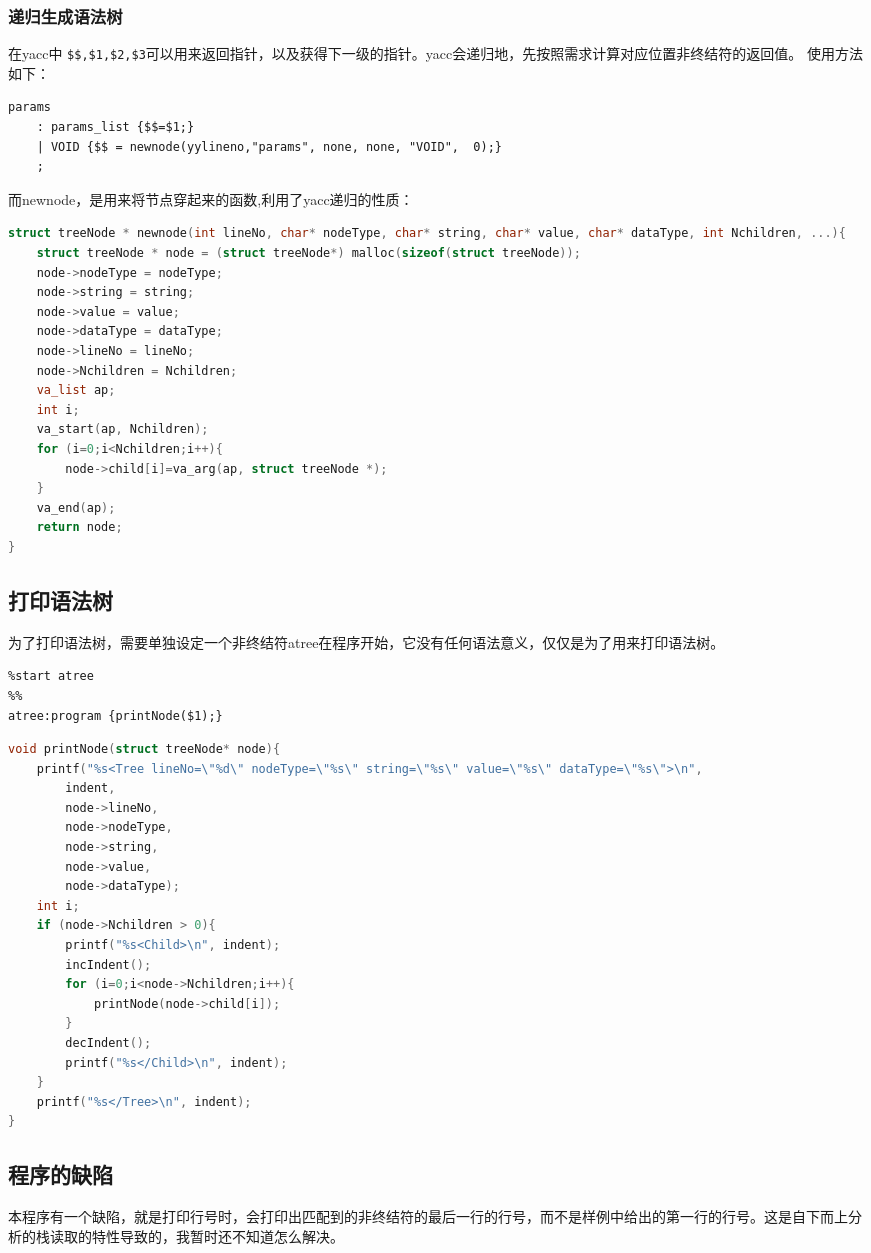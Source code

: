 \documentclass{article}
\begin{document}
\begin{CJK}{UTF8}{gkai}
\subsubsection{递归生成语法树}
在yacc中 \verb|$$,$1,$2,$3|可以用来返回指针，以及获得下一级的指针。yacc会递归地，先按照需求计算对应位置非终结符的返回值。
使用方法如下：
\begin{verbatim}
params
    : params_list {$$=$1;}
    | VOID {$$ = newnode(yylineno,"params", none, none, "VOID",  0);}
    ;
\end{verbatim}
而newnode，是用来将节点穿起来的函数,利用了yacc递归的性质：
\begin{lstlisting}[language=c]
struct treeNode * newnode(int lineNo, char* nodeType, char* string, char* value, char* dataType, int Nchildren, ...){
    struct treeNode * node = (struct treeNode*) malloc(sizeof(struct treeNode));
    node->nodeType = nodeType;
    node->string = string;
    node->value = value;
    node->dataType = dataType;
    node->lineNo = lineNo;
    node->Nchildren = Nchildren;
    va_list ap;
    int i;
    va_start(ap, Nchildren);
    for (i=0;i<Nchildren;i++){
        node->child[i]=va_arg(ap, struct treeNode *);
    }
    va_end(ap);
    return node;
}
\end{lstlisting}

\subsection{打印语法树}
为了打印语法树，需要单独设定一个非终结符atree在程序开始，它没有任何语法意义，仅仅是为了用来打印语法树。
\begin{verbatim}
%start atree
%%
atree:program {printNode($1);}
\end{verbatim}
\begin{lstlisting}[language=c]
void printNode(struct treeNode* node){
    printf("%s<Tree lineNo=\"%d\" nodeType=\"%s\" string=\"%s\" value=\"%s\" dataType=\"%s\">\n", 
        indent,
        node->lineNo,
        node->nodeType,
        node->string,
        node->value, 
        node->dataType);
    int i;
    if (node->Nchildren > 0){
        printf("%s<Child>\n", indent);
        incIndent();
        for (i=0;i<node->Nchildren;i++){
            printNode(node->child[i]);
        }
        decIndent();
        printf("%s</Child>\n", indent);
    }
    printf("%s</Tree>\n", indent);
}
\end{lstlisting}
\subsection{程序的缺陷}
本程序有一个缺陷，就是打印行号时，会打印出匹配到的非终结符的最后一行的行号，而不是样例中给出的第一行的行号。这是自下而上分析的栈读取的特性导致的，我暂时还不知道怎么解决。


\end{CJK}
\end{document}
